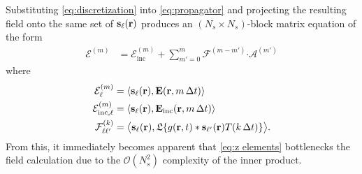 Substituting \cref{eq:discretization} into \cref{eq:propagator} and projecting the resulting field onto the same set of $\vb{s}_\ell(\vb{r})$ produces an $(N_s \times N_s)$-block matrix equation of the form
\begin{equation}
  \begin{aligned}
    \mathcal{E}^{(m)} &= \mathcal{E}_\text{inc}^{(m)} + \sum_{m'= 0}^m \mathcal{F}^{(m - m')} \boldsymbol{\cdot} \mathcal{A}^{(m')}
  \end{aligned}
  \label{eq:mot}
\end{equation}
where
\begin{subequations}
  \begin{align}
    \mathcal{E}^{(m)}_\ell &= \langle \vb{s}_\ell(\vb{r}), \vb{E}(\vb{r}, m \, \Delta t) \rangle \label{eq:f elements}\\
    \mathcal{E}^{(m)}_{\text{inc},\ell} &= \langle \vb{s}_\ell(\vb{r}), \vb{E}_\text{inc}(\vb{r}, m \, \Delta t) \rangle \label{eq:l elements}\\
    \mathcal{F}^{(k)}_{\ell\ell'} &= \big\langle \vb{s}_\ell(\vb{r}), \mathfrak{L}\qty{g(\vb{r}, t) \ast \vb{s}_{\ell'}(\vb{r}) T(k \, \Delta t)} \big\rangle \label{eq:z elements}.
  \end{align}
\end{subequations}
From this, it immediately becomes apparent that \cref{eq:z elements} bottlenecks the field calculation due to the $\mathcal{O}(N_s^2)$ complexity of the inner product.


